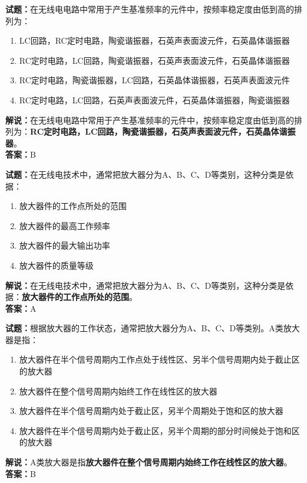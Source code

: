 \documentclass{ctexbook}
\begin{document}
\bigskip


\noindent\textbf{试题：}在无线电电路中常用于产生基准频率的元件中，按频率稳定度由低到高的排列为：
\begin{enumerate}[leftmargin=3em]
\item LC回路，RC定时电路，陶瓷谐振器，石英声表面波元件，石英晶体谐振器
\item RC定时电路，LC回路，陶瓷谐振器，石英声表面波元件，石英晶体谐振器
\item RC定时电路，陶瓷谐振器，LC回路，石英晶体谐振器，石英声表面波元件
\item RC定时电路，LC回路，石英声表面波元件，石英晶体谐振器，陶瓷谐振器
\end{enumerate}
\noindent\textbf{解说：}在无线电电路中常用于产生基准频率的元件中，按频率稳定度由低到高的排列为：\textbf{RC定时电路，LC回路，陶瓷谐振器，石英声表面波元件，石英晶体谐振器}。\\\noindent\textbf{答案：}B



\bigskip


\noindent\textbf{试题：}在无线电技术中，通常把放大器分为A、B、C、D等类别，这种分类是依据：
\begin{enumerate}[leftmargin=3em]
\item 放大器件的工作点所处的范围
\item 放大器件的最高工作频率
\item 放大器件的最大输出功率
\item 放大器件的质量等级
\end{enumerate}
\noindent\textbf{解说：}在无线电技术中，通常把放大器分为A、B、C、D等类别，这种分类是依据：\textbf{放大器件的工作点所处的范围}。\\\noindent\textbf{答案：}A



\bigskip


\noindent\textbf{试题：}根据放大器的工作状态，通常把放大器分为A、B、C、D等类别。A类放大器是指：
\begin{enumerate}[leftmargin=3em]
\item 放大器件在半个信号周期内工作点处于线性区、另半个信号周期内处于截止区的放大器
\item 放大器件在整个信号周期内始终工作在线性区的放大器
\item 放大器件在半个信号周期内处于截止区，另半个周期处于饱和区的放大器
\item 放大器件在半个信号周期内处于截止区，另半个周期的部分时间候处于饱和区的放大器
\end{enumerate}
\noindent\textbf{解说：}A类放大器是指\textbf{放大器件在整个信号周期内始终工作在线性区的放大器}。\\\noindent\textbf{答案：}B
\end{document}
